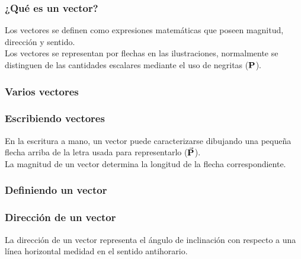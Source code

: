 \documentclass[12pt]{beamer}
\begin{document}
\begin{frame}
\frametitle{¿Qué es un vector?}
Los vectores se definen como expresiones matemáticas que poseen magnitud, dirección y sentido.
\\
\bigskip
\pause
Los vectores se representan por flechas en las ilustraciones, normalmente se distinguen de las cantidades escalares mediante el uso de negritas ($\vb{P}$).
\end{frame}
\begin{frame}
\frametitle{Varios vectores}
\begin{figure}
    \centering
\end{figure}
\end{frame}
\begin{frame}
\frametitle{Escribiendo vectores}
En la escritura a mano, un vector puede caracterizarse dibujando una pequeña flecha arriba de la letra usada para representarlo ($\va{P}$).
\\
\bigskip
\pause
La magnitud de un vector determina la longitud de la flecha correspondiente.
\end{frame}
\begin{frame}
\frametitle{Definiendo un vector}
\begin{figure}
    \centering
\end{figure}
\end{frame}
\begin{frame}
\frametitle{Dirección de un vector}
La dirección de un vector representa el ángulo de inclinación con respecto a una línea horizontal medidad en el sentido antihorario.
\pause
\begin{figure}
    \centering
\end{figure}
\end{frame}
\end{document}
